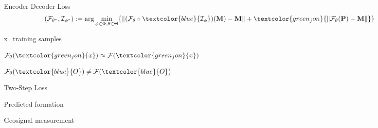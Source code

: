\begin{frame}{Encoder-Decoder Loss}
\begin{equation}
\begin{aligned}
	(\mathcal{F}_{\theta^\ast}, \mathcal{I}_{\phi^\ast}):=\arg \min_{\phi \in \Phi, \theta \in \Theta} \{ & \|(\mathcal{F}_{\theta} \circ \textcolor{blue}{\mathcal{I}_{\phi}})(\mathbf{M})-\mathbf{M}\| + \textcolor{green_jon}{\|{\cal F}_{\theta}({\bf P})-{\bf M}\|} \}
\end{aligned}
\notag
\end{equation}

\begin{figure}[!h]
	\centering
	
	\label{fig:regu}
\end{figure}

\center
\textcolor{green_jon}{x}=training samples

${\cal F}_\theta(\textcolor{green_jon}{x}) \approx {\cal F}(\textcolor{green_jon}{x})$

${\cal F}_\theta(\textcolor{blue}{O}) \neq {\cal F}(\textcolor{blue}{O})$
\end{frame}


\begin{frame}{Two-Step Loss}
\begin{center}
Predicted formation
\end{center}
\begin{figure}[!h]
				\centering
\end{figure}
\begin{center}
Geosignal measurement
\end{center}
\begin{figure}[!h]
	\centering
\end{figure}
\end{frame}


